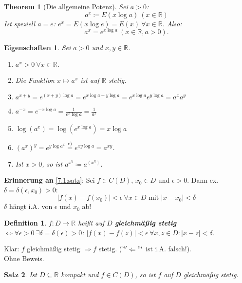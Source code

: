 \documentclass[14pt,titlepage,ngerman,a4paper,headsepline,DIV15,halfparskip*]{scrartcl}
\newcommand{\R}{\mathbb{R}}
\theoremstyle{named}
\newtheorem{namedtheorem}{Theorem} \counterwithin{namedtheorem}{section}
\theoremstyle{dotless}
\newtheorem{satz}[namedtheorem]{Satz}
\newtheorem*{definition}{Definition}
\newtheorem*{eigenschaften}{Eigenschaften}
\begin{document}
\begin{namedtheorem}[Die allgemeine Potenz] \label{7.15:prop-AllgPotenz}
	Sei $a > 0$:
	$$ a^{x} \coloneqq E(x \log a) ~(x \in \R) $$
	Ist speziell $a = e$: $e^{x} = E(x \log e) = E(x) ~\forall x \in \R$. Also:
	$$ a^{x} = e^{x \log a} ~(x \in \R, a > 0). $$ 
\end{namedtheorem}


\begin{eigenschaften}
	Sei $a > 0$ und $x, y \in \R$.
	\begin{enumerate}
		\item $a^{x} > 0 ~\forall x \in \R$.
		\item Die Funktion $x \mapsto a^{x}$ ist auf $\R$ stetig.
		\item $a^{x+y} = e^{(x+y)\log a} = e^{x\log a + y \log a} = e^{x \log a} e^{y \log a} = a^{x} a^{y}$
		\item $a^{-x} = e^{-x\log a} = \frac{1}{e^{x} \log a} = \frac{1}{a^{x}}$
		\item $\log(a^{x}) = \log ( e^{x \log a}) = x \log a$
		\item $(a^{x})^{y} = e^{y \log a^{x}} \overset{e)}{=} e^{xy \log a} = a^{xy}$.
		\item Ist $x > 0$, so ist $a^{x^{y}} \coloneqq a^{\left(x^{y}\right)}$.
	\end{enumerate}	
\end{eigenschaften}


\textbf{Erinnerung an} \ref{7.1:satz}: Sei $f \in C(D)$, $x_{0} \in D$ und $\epsilon > 0$. Dann ex. $\delta = \delta(\epsilon, x_{0}) > 0$:
	$$ |f(x) - f(x_{0})| < \epsilon ~\forall x \in D \text{ mit } |x - x_{0}| < \delta $$
	$\delta$ hängt i.A. von $\epsilon$ und $x_{0}$ ab!

\begin{definition}
	$f \colon D \rightarrow \R$ hei{\ss}t auf $D$ \textbf{gleichmä{\ss}ig stetig} $\iff \forall \epsilon > 0 ~\exists \delta = \delta(\epsilon) > 0$: $|f(x) - f(z)| < \epsilon ~\forall x, z \in D: |x - z| < \delta$.
\end{definition}

Klar: $f$ gleichmä{\ss}ig stetig $\Rightarrow f$ stetig. ($"'\Leftarrow "'$ ist i.A. falsch!). \\
Ohne Beweis.

\begin{satz} \label{7.16:satz}
	Ist $D \subseteq \R$ kompakt und $f \in C(D)$, so ist $f$ auf $D$ gleichmä{\ss}ig stetig.
\end{satz}
\end{document}
